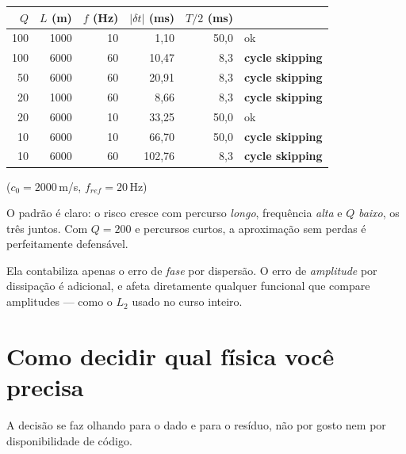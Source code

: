 \documentclass[11pt,a4paper,oneside]{report}
\begin{document}
\begin{center}
\begin{tabular}{@{}rrrrrl@{}}
\toprule
$Q$ & $L$ (m) & $f$ (Hz) & $|\delta t|$ (ms) & $T/2$ (ms) & \\
\midrule
100 & 1000 & 10 & 1{,}10 & 50{,}0 & ok \\
100 & 6000 & 60 & 10{,}47 & 8{,}3 & \textbf{cycle skipping} \\
50  & 6000 & 60 & 20{,}91 & 8{,}3 & \textbf{cycle skipping} \\
20  & 1000 & 60 & 8{,}66 & 8{,}3 & \textbf{cycle skipping} \\
20  & 6000 & 10 & 33{,}25 & 50{,}0 & ok \\
10  & 6000 & 10 & 66{,}70 & 50{,}0 & \textbf{cycle skipping} \\
10  & 6000 & 60 & 102{,}76 & 8{,}3 & \textbf{cycle skipping} \\
\bottomrule
\end{tabular}
\end{center}
{\small ($c_0 = 2000$\,m/s, $f_{ref} = 20$\,Hz)}

O padrão é claro: o risco cresce com percurso \emph{longo}, frequência
\emph{alta} e $Q$ \emph{baixo}, os três juntos. Com $Q = 200$ e percursos
curtos, a aproximação sem perdas é perfeitamente defensável.

\begin{atencao}
Ela contabiliza apenas o erro de \emph{fase} por dispersão. O erro de
\emph{amplitude} por dissipação é adicional, e afeta diretamente qualquer
funcional que compare amplitudes --- como o $L_2$ usado no curso inteiro.
\end{atencao}

\section{Como decidir qual física você precisa}

A decisão se faz olhando para o dado e para o resíduo, não por gosto nem por
disponibilidade de código.
\end{document}
